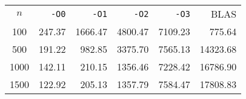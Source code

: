 \begin{center}
  \bgroup{}
  \begin{tabular}{c|rrrr|r}
    \hline
    $n$ & \texttt{-O0} & \texttt{-O1} & \texttt{-O2} & \texttt{-O3} & BLAS \\
    \hhline{======}
    100 & 247.37 & 1666.47 & 4800.47 & 7109.23 & 775.64 \\
    500 & 191.22 & 982.85 & 3375.70 & 7565.13 & 14323.68 \\
    1000 & 142.11 & 210.15 & 1356.46 & 7228.42 & 16786.90 \\
    1500 & 122.92 & 205.13 & 1357.79 & 7584.47 & 17808.83 \\
    \hline
  \end{tabular}
  \egroup
\end{center}

